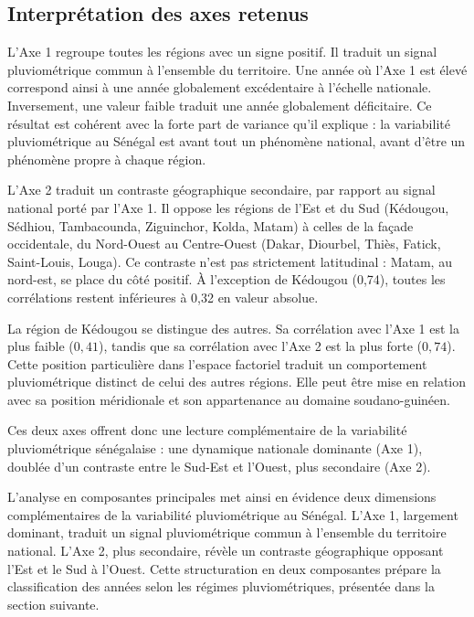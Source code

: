 \documentclass[12pt,a4paper]{report}
\begin{document}
\subsection{Interprétation des axes retenus}
\label{sec:interpretation-axes}

L'Axe 1 regroupe toutes les régions avec un signe positif. Il traduit un signal pluviométrique commun à l'ensemble du territoire. Une année où l'Axe 1 est élevé correspond ainsi à une année globalement excédentaire à l'échelle nationale. Inversement, une valeur faible traduit une année globalement déficitaire. Ce résultat est cohérent avec la forte part de variance qu'il explique : la variabilité pluviométrique au Sénégal est avant tout un phénomène national, avant d'être un phénomène propre à chaque région.

L’Axe 2 traduit un contraste géographique secondaire, par rapport au signal national porté par l’Axe 1. Il oppose les régions de l’Est et du Sud (Kédougou, Sédhiou, Tambacounda, Ziguinchor, Kolda, Matam) à celles de la façade occidentale, du Nord-Ouest au Centre-Ouest (Dakar, Diourbel, Thiès, Fatick, Saint-Louis, Louga). Ce contraste n’est pas strictement latitudinal : Matam, au nord-est, se place du côté positif. À l’exception de Kédougou (0,74), toutes les corrélations restent inférieures à 0,32 en valeur absolue.

La région de Kédougou se distingue des autres. Sa corrélation avec l’Axe 1 est la plus faible ($0{,}41$), tandis que sa corrélation avec l’Axe 2 est la plus forte ($0{,}74$). Cette position particulière dans l’espace factoriel traduit un comportement pluviométrique distinct de celui des autres régions. Elle peut être mise en relation avec sa position méridionale et son appartenance au domaine soudano-guinéen.

Ces deux axes offrent donc une lecture complémentaire de la variabilité pluviométrique sénégalaise : une dynamique nationale dominante (Axe 1), doublée d’un contraste entre le Sud-Est et l’Ouest, plus secondaire (Axe 2).


L'analyse en composantes principales met ainsi en évidence deux dimensions complémentaires de la variabilité pluviométrique au Sénégal. L'Axe 1, largement dominant, traduit un signal pluviométrique commun à l'ensemble du territoire national. L'Axe 2, plus secondaire, révèle un contraste géographique opposant l’Est et le Sud à l’Ouest. Cette structuration en deux composantes prépare la classification des années selon les régimes pluviométriques, présentée dans la section suivante.
\end{document}
